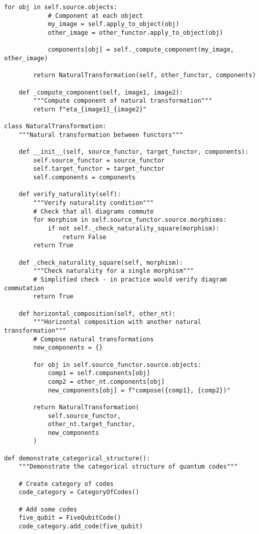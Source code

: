\documentclass[12pt,a4paper]{article}
\begin{document}
\begin{lstlisting}[style=python,caption=Advanced categorical structures for QEC]
        for obj in self.source.objects:
            # Component at each object
            my_image = self.apply_to_object(obj)
            other_image = other_functor.apply_to_object(obj)
            
            components[obj] = self._compute_component(my_image, other_image)
            
        return NaturalTransformation(self, other_functor, components)
        
    def _compute_component(self, image1, image2):
        """Compute component of natural transformation"""
        return f"eta_{image1}_{image2}"

class NaturalTransformation:
    """Natural transformation between functors"""
    
    def __init__(self, source_functor, target_functor, components):
        self.source_functor = source_functor
        self.target_functor = target_functor
        self.components = components
        
    def verify_naturality(self):
        """Verify naturality condition"""
        # Check that all diagrams commute
        for morphism in self.source_functor.source.morphisms:
            if not self._check_naturality_square(morphism):
                return False
        return True
        
    def _check_naturality_square(self, morphism):
        """Check naturality for a single morphism"""
        # Simplified check - in practice would verify diagram commutation
        return True
        
    def horizontal_composition(self, other_nt):
        """Horizontal composition with another natural transformation"""
        # Compose natural transformations
        new_components = {}
        
        for obj in self.source_functor.source.objects:
            comp1 = self.components[obj]
            comp2 = other_nt.components[obj]
            new_components[obj] = f"compose({comp1}, {comp2})"
            
        return NaturalTransformation(
            self.source_functor,
            other_nt.target_functor,
            new_components
        )

def demonstrate_categorical_structure():
    """Demonstrate the categorical structure of quantum codes"""
    
    # Create category of codes
    code_category = CategoryOfCodes()
    
    # Add some codes
    five_qubit = FiveQubitCode()
    code_category.add_code(five_qubit)
    

\end{lstlisting}
\end{document}
